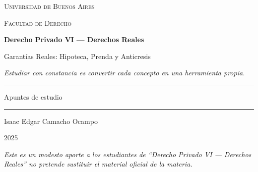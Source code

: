 \documentclass[12pt,oneside]{book}
\newcommand{\universidad}{Universidad de Buenos Aires}
\newcommand{\facultad}{Facultad de Derecho}
\newcommand{\materia}{Derecho Privado VI --- Derechos Reales}
\newcommand{\titulo}{Garantías Reales: Hipoteca, Prenda y Anticresis}
\newcommand{\autor}{Isaac Edgar Camacho Ocampo}
\newcommand{\anio}{2025}
\begin{document}

\begin{titlepage}

\thispagestyle{empty}

\begin{center}

\vspace*{1cm}

{\large \textsc{\universidad}}

\vspace{0.2cm}

{\large \textsc{\facultad}}

\vspace{3cm}

{\Huge \textbf{\materia}}

\vspace{1cm}

{\LARGE \titulo}

\vspace{0.8cm}

\textit{Estudiar con constancia es convertir cada concepto en una herramienta propia.}

\vspace{1.2cm}

\rule{0.70\textwidth}{0.5pt}

\vspace{0.5cm}

{\large Apuntes de estudio}

\vspace{0.5cm}

\rule{0.70\textwidth}{0.5pt}

\vfill

{\large \autor}

\vspace{0.3cm}

{\large \anio}

\end{center}

\vfill

\begin{flushleft}
\textit{Este es un modesto aporte a los estudiantes de ``Derecho Privado VI --- Derechos Reales'' no pretende sustituir el material oficial de la materia.}
\end{flushleft}

\end{titlepage}
\end{document}
